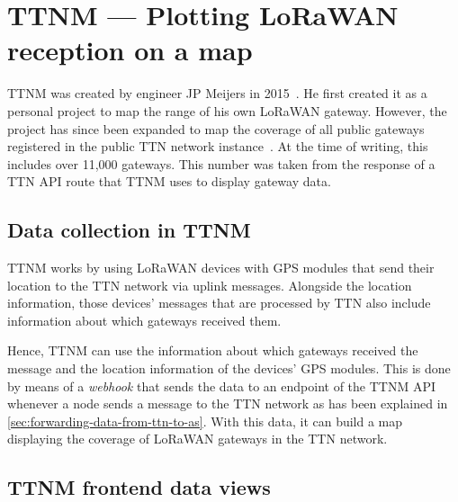 \section{\acl{TTNM} — Plotting \acs{LoRaWAN} reception on a map}

\acf{TTNM} was created by engineer JP Meijers in 2015~\cite{linkedin_23_nodate}.
He first created it as a personal project to map the range of his own \ac{LoRaWAN} gateway.
However, the project has since been expanded to map the coverage of all public gateways registered in the public \ac{TTN} network instance~\cite{the_things_network_jp_2018}.
At the time of writing, this includes over 11,000 gateways.
This number was taken from the response of a \ac{TTN} \ac{API} route that \ac{TTNM} uses to display gateway data.

\subsection{Data collection in \acl{TTNM}}\label{sec:ttm-data-collection}

\acl{TTNM} works by using \ac{LoRaWAN} devices with \ac{GPS} modules that send their location to the \ac{TTN} network via uplink messages.
Alongside the location information, those devices' messages that are processed by \ac{TTN} also include information about which gateways received them.

Hence, \acl{TTNM} can use the information about which gateways received the message and the location information of the devices' \ac{GPS} modules.
This is done by means of a \emph{webhook} that sends the data to an endpoint of the \acl{TTNM} \ac{API} whenever a node sends a message to the \ac{TTN} network as has been explained in \cref{sec:forwarding-data-from-ttn-to-as}.
With this data, it can build a map displaying the coverage of \ac{LoRaWAN} gateways in the \ac{TTN} network.

\subsection{\acl{TTNM} frontend data views}

